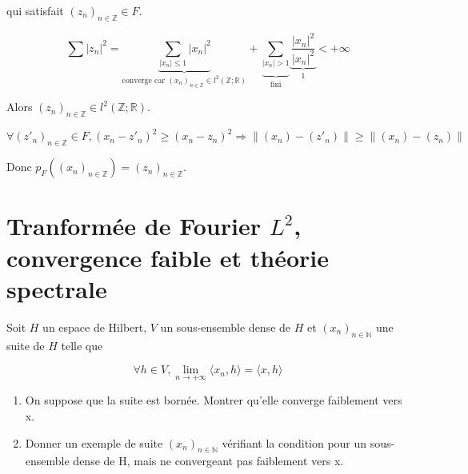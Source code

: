 \documentclass[10pt,a4paper,oneside]{article}
\newenvironment{exercice}[1][Exercice]{\begin{trivlist}
\item[\hskip \labelsep {\bfseries #1}]}{\end{trivlist}}
\newenvironment{solution}[1][Solution]{\begin{trivlist}
\item[\hskip \labelsep {\bfseries #1}]}{\end{trivlist}}
\begin{document}
\begin{exercice}
\begin{solution}
\begin{enumerate}
qui satisfait $(z_n)_{n \in \mathbb{Z}} \in F$.

\[
\sum |z_n|^2 = \underbrace{\sum_{|x_n| \leq 1} |x_n|^2}_{\text{converge car } (x_n)_{n \in \mathbb{Z}} \in l^2(\mathbb{Z};\mathbb{R})} + \underbrace{ \sum_{|x_n| > 1} }_{ \text{fini} }  \underbrace{ \frac{|x_n|^2}{|x_n|^2} }_{1} < +\infty
\]

Alors $(z_n)_{n \in \mathbb{Z}} \in l^2(\mathbb{Z};\mathbb{R})$.

\[
\forall (z'_n)_{n \in \mathbb{Z}} \in F, (x_n - z'_n)^2 \geq (x_n - z_n)^2 \Rightarrow \| (x_n) - (z'_n) \| \geq \| (x_n) - (z_n) \|
\]

Donc $p_{F}((x_n)_{n \in \mathbb{Z}}) = (z_n)_{n \in \mathbb{Z}}$.

\end{enumerate}

\end{solution}

\end{exercice}

\section{Tranformée de Fourier $L^2$, convergence faible et théorie spectrale}

\begin{exercice}

Soit $H$ un espace de Hilbert, $V$ un sous-ensemble dense de $H$ et $(x_n)_{n \in \mathbb{N}}$ une suite de $H$ telle que 

\[
\forall h \in V, \lim\limits_{n \rightarrow +\infty} \langle x_n,h \rangle = \langle x,h \rangle
\]

\begin{enumerate}

\item
On suppose que la suite est bornée. Montrer qu'elle converge faiblement vers x.

\item
Donner un exemple de suite $(x_n)_{n \in \mathbb{N}}$ vérifiant la condition pour un sous-ensemble dense de H, mais ne convergeant pas faiblement vers x.

\end{enumerate}

\end{exercice}
\end{document}
